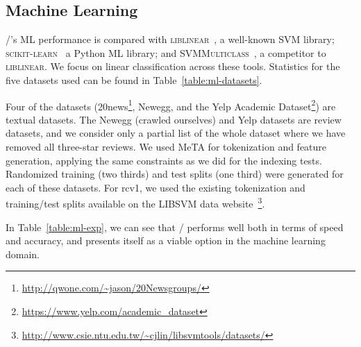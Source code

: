 





\subsection{Machine Learning}

\meta/'s ML performance is compared with \textsc{liblinear}~\cite{liblinear}, a
well-known SVM library; \textsc{scikit-learn}~\cite{scikit} a Python ML library;
and \textsc{SVMMulticlass}~\cite{svmmulticlass}, a competitor to
\textsc{liblinear}. We focus on linear classification across these tools.
Statistics for the five datasets used can be found in
Table~\ref{table:ml-datasets}.

Four of the datasets
(20news\footnote{\url{http://qwone.com/~jason/20Newsgroups/}}, Newegg, and the
Yelp Academic Dataset\footnote{\url{https://www.yelp.com/academic_dataset}}) are
textual datasets. The Newegg (crawled ourselves) and Yelp datasets are review
datasets, and we consider only a partial list of the whole dataset where we have
removed all three-star reviews. We used MeTA for tokenization and feature
generation, applying the same constraints as we did for the indexing tests.
Randomized training (two thirds) and test splits (one third) were generated for
each of these datasets. For rcv1, we used the existing tokenization and
training/test splits available on the LIBSVM data
website~\footnote{\url{http://www.csie.ntu.edu.tw/~cjlin/libsvmtools/datasets/}}.

In Table~\ref{table:ml-exp}, we can see that \meta/ performs well both in
terms of speed and accuracy, and presents itself as a viable option in the
machine learning domain.



